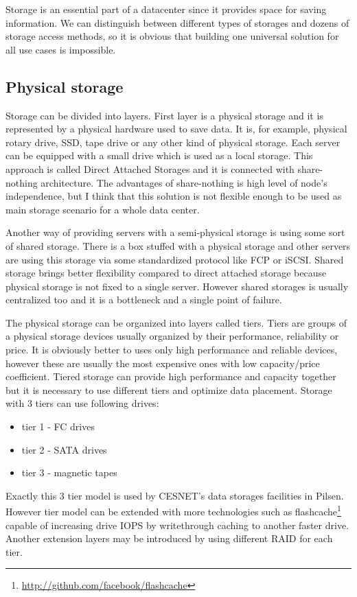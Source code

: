

Storage is an essential part of a datacenter since it provides space for saving information. We can distinguish between different types of storages and dozens of storage access methods, so it is obvious that building one universal solution for all use cases is impossible. 

\subsection{Physical storage}
Storage can be divided into layers. First layer is a physical storage and it is represented by a physical hardware used to save data. It is, for example, physical rotary drive, \Ac{SSD}, tape drive or any other kind of physical storage. Each server can be equipped with a small drive which is used as a local storage. This approach is called Direct Attached Storages and it is connected with share-nothing architecture. The advantages of share-nothing is high level of node's independence, but I think that this solution is not flexible enough to be used as main storage scenario for a whole data center.

Another way of providing servers with a semi-physical storage is using some sort of shared storage. There is a box stuffed with a physical storage and other servers are using this storage via some standardized protocol like \Ac{FCP} or \Ac{iSCSI}. Shared storage brings better flexibility compared to direct attached storage because physical storage is not fixed to a single server. However shared storages is usually centralized too and it is a bottleneck and a single point of failure.

The physical storage can be organized into layers called tiers. Tiers are groups of a physical storage devices usually organized by their performance, reliability or price. It is obviously better to uses only high performance and reliable devices, however these are usually the most expensive ones with low capacity/price coefficient. Tiered storage can provide high performance and capacity together but it is necessary to use different tiers and optimize data placement. Storage with 3 tiers can use following drives:
\begin{itemize}
	\item tier 1 - \Ac{FC} drives
	\item tier 2 - \Ac{SATA} drives
	\item tier 3 - magnetic tapes
\end{itemize}
Exactly this 3 tier model is used by CESNET's data storages facilities in Pilsen. However tier model can be extended with more technologies such as flashcache\footnote{\url{http://github.com/facebook/flashcache}} capable of increasing drive \Ac{IOPS} by writethrough caching to another faster drive. Another extension layers may be introduced by using different \Ac{RAID} for each tier.

